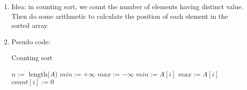 \documentclass[12pt]{article}
\begin{document}
    \begin{enumerate}
        \item Idea: in counting sort, we count the number of elements having distinct value. Then do some arithmetic to calculate the position of each element in the sorted array.
        \item Pseudo code:
        \begin{algorithm}[H]
            \caption{Counting sort}
            \begin{algorithmic}[1]
                    \State $n:=$ length($A$)
                    \State $\textit{min}:=+\infty$
                    \State $\textit{max}:=-\infty$
                            \State $\textit{min}:=A[i]$
                        \EndIf
                            \State $\textit{max}:=A[i]$
                        \EndIf
                    \EndFor 
                        \State $\textit{count}[i]:=0$
                    \EndFor
            \end{algorithmic}
        \end{algorithm}


\end{enumerate}
\end{document}
